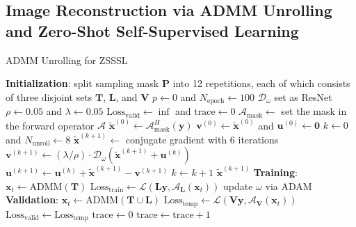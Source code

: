 \documentclass[journal,twoside,web]{ieeecolor}
\begin{document}
	\subsection{Image Reconstruction via ADMM Unrolling and Zero-Shot Self-Supervised Learning}

	\begin{algorithm}
		\caption{ADMM Unrolling for ZSSSL} \label{ALG:ADMM}
		\begin{algorithmic}[1]
			\State \textbf{Initialization}:
			\State \;\; split sampling mask $\mathbf{P}$ into 12 repetitions, each of which consists of three disjoint sets $\mathbf{T}$, $\mathbf{L}$, and $\mathbf{V}$
			\State \;\: $p \gets 0$ and $N_{\mathrm{epoch}} \gets 100$
			\State \;\; $\mathcal{D}_{\omega}$ set as ResNet
			\State \;\; $\rho \gets 0.05$ and $\lambda \gets 0.05$
			\State \;\; $\mathrm{Loss}_{\mathrm{valid}} \gets \inf$ and $\mathrm{trace} \gets 0$
			\State $\mathcal{A}_\mathrm{mask} \gets$ set the mask in the forward operator $\mathcal{A}$
			\State $\tilde{\mathbf{x}}^{(0)} \gets \mathcal{A}_\mathrm{mask}^H (\mathbf{y})$
			\State $\mathbf{v}^{(0)} \gets \tilde{\mathbf{x}}^{(0)}$ and $\mathbf{u}^{(0)} \gets \mathbf{0}$
			\State $k \gets 0$ and $N_{\mathrm{unroll}} \gets 8$
			\State $\tilde{\mathbf{x}}^{(k+1)} \gets $ conjugate gradient with 6 iterations
			\State $\mathbf{v}^{(k+1)} \gets (\lambda/\rho) \cdot \mathcal{D}_{\omega} (\mathbf{\tilde{x}}^{(k+1)} + \mathbf{u}^{(k)})$
			\State $\mathbf{u}^{(k+1)} \gets \mathbf{u}^{(k)} + \mathbf{\tilde{x}}^{(k+1)} - \mathbf{v}^{(k+1)}$
			\State $k \gets k+1$
			\EndWhile
			\State \Return $\tilde{\mathbf{x}}^{(k+1)}$
			\EndFunction
			\State \textbf{Training}:
			\State $\mathbf{x}_t \gets \mathrm{ADMM}(\mathbf{T})$
			\State $\mathrm{Loss}_{\mathrm{train}} \gets \mathcal{L}(\mathbf{L} \mathbf{y}, \mathcal{A}_\mathbf{L}(\mathbf{x}_t))$
			\State update $\omega$ via ADAM
			\State \textbf{Validation}:
			\State $\mathbf{x}_t \gets \mathrm{ADMM}(\mathbf{T} \cup \mathbf{L})$
			\State $\mathrm{Loss}_{\mathrm{temp}} \gets \mathcal{L}(\mathbf{V} \mathbf{y}, \mathcal{A}_\mathbf{V}(\mathbf{x}_t))$
			\State $\mathrm{Loss}_{\mathrm{valid}} \gets \mathrm{Loss}_{\mathrm{temp}}$
			\State $\mathrm{trace} \gets 0$
			\Else
			\State $\mathrm{trace} \gets \mathrm{trace} + 1$
			\EndIf
			\EndWhile
		\end{algorithmic}
	\end{algorithm}
\end{document}
